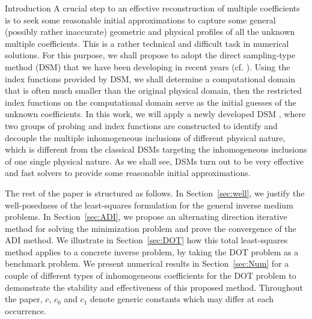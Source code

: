\documentclass[11pt]{article}%
\renewcommand{\_}{{\fontfamily{ptm}\selectfont\textunderscore}}
\theoremstyle{plain}
\numberwithin{equation}{section}
\begin{document}
\begin{section}{Introduction}
A crucial step to an effective reconstruction of multiple coefficients is to seek some reasonable initial approximations 
to capture some general (possibly rather inaccurate) geometric and physical profiles of all the unknown multiple coefficients. 
This is a rather technical and difficult task in numerical solutions. 
For this purpose, we shall propose to adopt the direct sampling-type method (DSM) that we have been developing 
in recent years (cf. \cite{ito2012two, chow2014direct, chow2015direct, chow2018time}). 
Using the index functions provided by DSM, we shall determine a computational domain that is often much smaller 
than the original physical domain, then the restricted index functions on the computational domain serve 
as the initial guesses of the unknown coefficients. 
In this work, we will apply a newly developed DSM \cite{chow2020direct}, where two groups of probing and index functions are constructed to identify and decouple the multiple inhomogeneous inclusions of different physical nature, 
which is different from the classical DSMs targeting the inhomogeneous inclusions of one single physical nature. 
As we shall see, DSMs turn out to be very effective and fast solvers to provide some reasonable initial approximations.



The rest of the paper is structured as follows. In Section~\ref{sec:well}, we justify the well-posedness of the least-squares formulation for the general inverse medium problems. In Section~\ref{sec:ADI}, we propose an alternating direction iterative method for solving the minimization problem and prove the convergence of the ADI method. 
We illustrate in Section~\ref{sec:DOT} how this total least-squares method applies to a concrete inverse problem, 
by taking the DOT problem as a benchmark problem. We present numerical results in Section~\ref{sec:Num} for a couple of 
different types of inhomogeneous coefficients for the DOT problem to demonstrate the stability and effectiveness 
of this proposed method. Throughout the paper, $c$, $c_0$ and $c_1$ denote generic constants which may differ at each occurrence.
\end{section}
\end{document}
